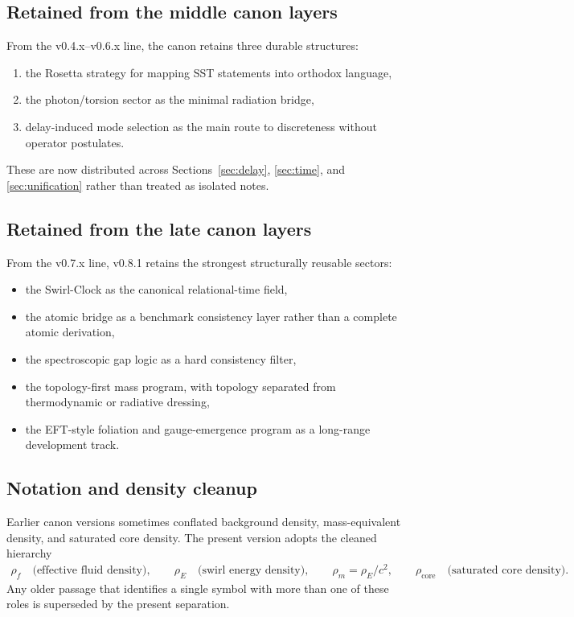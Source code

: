 \documentclass[11pt]{article}
\theoremstyle{definition}
\theoremstyle{plain}
\theoremstyle{remark}
\newcommand{\rhoF}{{\rho_{\!f}}}
\newcommand{\rhoE}{\rho_{\!E}}
\newcommand{\rhoM}{\rho_{\!m}}
\newcommand{\rhocore}{\rho_{\mathrm{core}}}
\begin{document}
    \subsection{Retained from the middle canon layers}
        From the v0.4.x--v0.6.x line, the canon retains three durable structures:
        \begin{enumerate}
            \item the Rosetta strategy for mapping SST statements into orthodox language,
            \item the photon/torsion sector as the minimal radiation bridge,
            \item delay-induced mode selection as the main route to discreteness without operator postulates.
        \end{enumerate}
        These are now distributed across Sections~\ref{sec:delay}, \ref{sec:time}, and \ref{sec:unification} rather than treated as isolated notes.

    \subsection{Retained from the late canon layers}
        From the v0.7.x line, v0.8.1 retains the strongest structurally reusable sectors:
        \begin{itemize}
            \item the Swirl-Clock as the canonical relational-time field,
            \item the atomic bridge as a benchmark consistency layer rather than a complete atomic derivation,
            \item the spectroscopic gap logic as a hard consistency filter,
            \item the topology-first mass program, with topology separated from thermodynamic or radiative dressing,
            \item the EFT-style foliation and gauge-emergence program as a long-range development track.
        \end{itemize}

    \subsection{Notation and density cleanup}
        Earlier canon versions sometimes conflated background density, mass-equivalent density, and saturated core density. The present version adopts the cleaned hierarchy
        \begin{align}
            \rhoF \quad \text{(effective fluid density)},
            \qquad
            \rhoE \quad \text{(swirl energy density)},
            \qquad
            \rhoM = \rhoE/c^2,
            \qquad
            \rhocore \quad \text{(saturated core density)}.
        \end{align}
        Any older passage that identifies a single symbol with more than one of these roles is superseded by the present separation.
\end{document}
